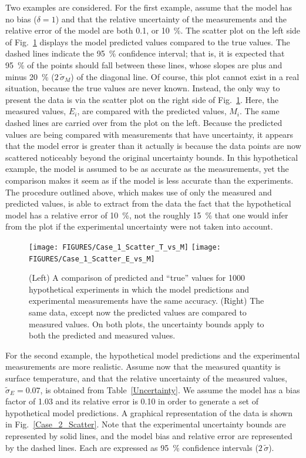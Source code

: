 Two examples are considered. For the first example, assume that the model has no bias ($\delta=1$) and that the relative uncertainty of the measurements and the
relative error of the model are both 0.1, or 10~\%. The scatter plot on the left side of Fig.~\ref{Case_1_Scatter} displays the model predicted values compared to the
true values. The dashed lines indicate the 95~\% confidence interval; that is, it is expected that 95~\% of the points should fall between these
lines, whose slopes are plus and minus 20~\% ($2\, \widetilde{\sigma}_M$) of the diagonal line. Of course, this plot cannot exist in a real situation, because the true
values are never known. Instead, the only way to present the data is via the scatter plot on the right side of Fig.~\ref{Case_1_Scatter}. Here, the measured values, $E_i$, are
compared with the predicted values, $M_i$. The same dashed lines are carried over from the plot on the left. Because the predicted values are being compared
with measurements that have uncertainty, it appears that the model error is greater than it actually is because the data points are now scattered noticeably beyond the
original uncertainty bounds. In this hypothetical example, the model is
assumed to be as accurate as the measurements, yet the comparison makes it seem as if the model is less accurate than the experiments. The procedure outlined
above, which makes use of only the measured and predicted values, is able to extract from the data the fact that the hypothetical model has a
relative error of 10~\%, not the roughly 15~\% that one would infer from the plot if the experimental uncertainty were not taken into account.

\begin{figure}[t]
\begin{center}
\texttt{[image: FIGURES/Case\_1\_Scatter\_T\_vs\_M]}
\texttt{[image: FIGURES/Case\_1\_Scatter\_E\_vs\_M]}
\end{center}
\caption[Verification of the model error calculation, Case 1.]{(Left) A comparison of predicted and ``true'' values for 1000 hypothetical
experiments in which the model predictions and experimental measurements have the same accuracy.
(Right) The same data, except now the predicted values are compared to measured values. On both plots, the uncertainty bounds apply to both
the predicted and measured values.}
\label{Case_1_Scatter}
\end{figure}


For the second example, the hypothetical model predictions and the experimental measurements are more realistic. Assume now that the
measured quantity is surface temperature, and that the relative uncertainty of the measured values, $\widetilde{\sigma}_E=0.07$, is obtained from Table~\ref{Uncertainty}.
We assume the model has a bias factor of 1.03 and its relative error is 0.10 in order to generate a set of hypothetical model predictions.
A graphical representation of the data is shown in Fig.~\ref{Case_2_Scatter}. Note that the
experimental uncertainty bounds are represented by solid lines, and the model bias and relative error are represented by the dashed lines.
Each are expressed as 95~\% confidence intervals ($2 \, \widetilde{\sigma}$).

